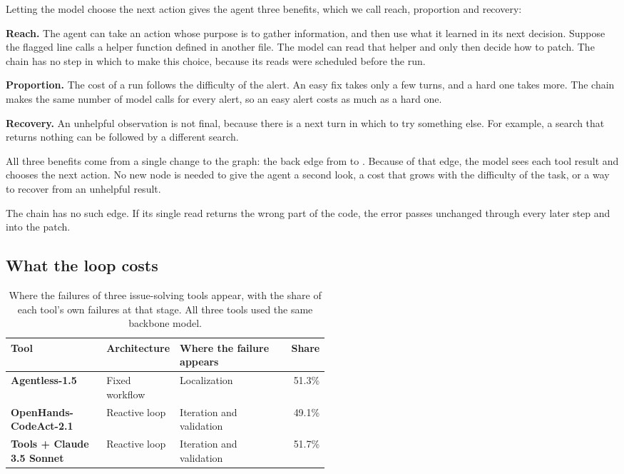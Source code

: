 Letting the model choose the next action gives the agent three benefits, which we call reach,
proportion and recovery:
\bi
\item \textbf{Reach.} The agent can take an action whose purpose is to gather information, and then
use what it learned in its next decision. Suppose the flagged line calls a helper function defined
in another file. The model can read that helper and only then decide how to patch. The chain has no
step in which to make this choice, because its reads were scheduled before the run.
\item \textbf{Proportion.} The cost of a run follows the difficulty of the alert. An easy fix takes
only a few turns, and a hard one takes more. The chain makes the same number of model calls for
every alert, so an easy alert costs as much as a hard one.
\item \textbf{Recovery.} An unhelpful observation is not final, because there is a next turn in
which to try something else. For example, a search that returns nothing can be followed by a
different search.
\ei

All three benefits come from a single change to the graph: the back edge from  to
. Because of that edge, the model sees each tool result and chooses the next
action. No new node is needed to give the agent a second look, a cost that grows with the difficulty
of the task, or a way to recover from an unhelpful result.

The chain has no such edge. If its single read returns the wrong part of the code, the error passes
unchanged through every later step and into the patch.

\subsection{What the loop costs}
\label{sec:reactive-costs}

\begin{table}[t]
  \caption{Where the failures of three issue-solving tools appear, with the share of each tool's
  own failures at that stage. All three tools used the same backbone model.}
  \label{tab:reactive-failures}
  \begin{adjustbox}{width=\linewidth}\begin{tabularx}{\linewidth}{L{0.3\linewidth}L{0.22\linewidth}Xr}
    \toprule
    \textbf{Tool} & \textbf{Architecture} & \textbf{Where the failure appears} & \textbf{Share} \\
    \midrule
    \textbf{Agentless-1.5} & Fixed workflow & Localization & 51.3\% \\
    \textbf{OpenHands-CodeAct-2.1} & Reactive loop & Iteration and validation & 49.1\% \\
    \textbf{Tools + Claude 3.5 Sonnet} & Reactive loop & Iteration and validation & 51.7\% \\
    \bottomrule
  \end{tabularx}\end{adjustbox}
\end{table}

